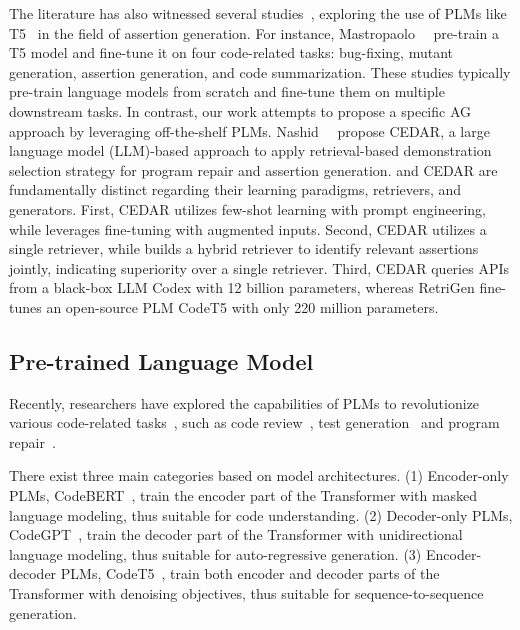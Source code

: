 The literature has also witnessed several studies~\cite{tufano2022generating, mastropaolo2021studying, mastropaolo2022using}, exploring the use of PLMs like T5~\cite{raffel2020exploring} in the field of assertion generation.
For instance, Mastropaolo~\etal~\cite{mastropaolo2022using} pre-train a T5 model and fine-tune it on four code-related tasks: bug-fixing, mutant generation, assertion generation, and code summarization.
These studies typically pre-train language models from scratch and fine-tune them on multiple downstream tasks.
In contrast, our work attempts to propose a specific AG approach by leveraging off-the-shelf PLMs. 
Nashid~\etal~\cite{nashid2023retrieval} propose CEDAR, a large language model (LLM)-based approach to apply retrieval-based demonstration selection strategy for program repair and assertion generation.
\toolname{} and CEDAR are fundamentally distinct regarding their learning paradigms, retrievers, and generators.
First, CEDAR utilizes few-shot learning with prompt engineering, while \toolname{} leverages fine-tuning with augmented inputs.
Second, CEDAR utilizes a single retriever, while \toolname{} builds a hybrid retriever to identify relevant assertions jointly, indicating superiority over a single retriever. 
Third, CEDAR queries APIs from a black-box LLM Codex with 12 billion parameters, whereas RetriGen fine-tunes an open-source PLM CodeT5 with only 220 million parameters. 


\subsection{Pre-trained Language Model}
\label{sec:background_LLM}


Recently, researchers have explored the capabilities of PLMs to revolutionize various code-related tasks~\cite{fan2023large,zhang2023survey_se}, such as code review~\cite{tufano2022using, li2022automating}, test generation~\cite{yuan2023no,xie2023chatunitest,wang2024hits,gu2024testart,tang2024chatgpt,yang2024evaluation,ryan2024code,lemieux2023codamosa} and program repair~\cite{zhang2023gamma,xia2023automated,zhang2024systematic}.

There exist three main categories based on model architectures.
(1) Encoder-only PLMs, \eg CodeBERT~\cite{feng2020codebert}, train the encoder part of the Transformer with masked language modeling, thus suitable for code understanding.
(2) Decoder-only PLMs, \eg CodeGPT~\cite{lu2021codexglue}, train the decoder part of the Transformer with unidirectional language modeling, thus suitable for auto-regressive generation.
(3) Encoder-decoder PLMs, \eg CodeT5~\cite{wang2021codet5}, train both encoder and decoder parts of the Transformer with denoising objectives, thus suitable for sequence-to-sequence generation.

